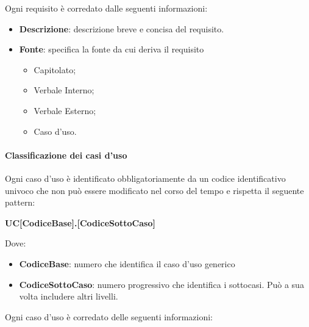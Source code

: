 Ogni requisito è corredato dalle seguenti informazioni:
\begin{itemize}
  \item \textbf{Descrizione}: descrizione breve e concisa del requisito.
  \item \textbf{Fonte}: specifica la fonte da cui deriva il requisito
        \begin{itemize}
          \item Capitolato;
          \item Verbale Interno;
          \item Verbale Esterno;
          \item Caso d'uso.
        \end{itemize}
\end{itemize}

\paragraph{Classificazione dei casi d'uso} \label{_classificazioneCasiUso}
Ogni caso d'uso è identificato obbligatoriamente da un codice identificativo univoco che non può essere modificato nel corso del tempo e rispetta il seguente pattern:
	\begin{center}
	\textbf{UC[CodiceBase].[CodiceSottoCaso]}
	\end{center}

Dove:

\begin{itemize}
  \item \textbf{CodiceBase}: numero che identifica il caso d'uso generico
  \item \textbf{CodiceSottoCaso}: numero progressivo che identifica i sottocasi.  Può a sua volta includere altri livelli.
\end{itemize}

Ogni caso d'uso è corredato delle seguenti informazioni:

